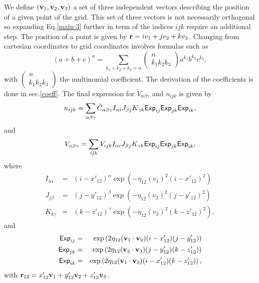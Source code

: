 \documentclass[prb]{revtex4}
\begin{document}
We define $({\bf v}_1, {\bf v}_2, {\bf v}_3)$ a set of three independent vectors
describing the position of a given point of the grid. This set of three vectors
is not necessarily orthogonal so expanding Eq.\ref{main:3} further in term of
the indices $ijk$ require an additional step. The position of a point is given
by ${\bf r} = i v_1 + j v_2 + k v_3$. Changing from cartesian coordinates to
grid coordinates involves formulas such as
\begin{equation}
  (a + b + c) ^ n = \sum_{k_1+k_2+k_3 = n} \left(\begin{array}{c} n\\k_1 k_2 k_3\end{array}\right) a^{k_1} b^{k_2} c^{k_3},
\end{equation}
with $\left(\begin{array}{c} n\\k_1 k_2 k_3\end{array}\right)$ the multinomial coefficient.
The derivation of the coefficients is done in sec.\ref{coeff}. The final expression for ${\tilde V}_{\alpha\beta\gamma}$ and $n_{ijk}$ is given by
\begin{equation}
  \label{main:8}
  n_{ijk} = \sum_{\alpha\beta\gamma}  {\tilde C}_{\alpha\beta\gamma} I_{\alpha i} J_{\beta j} K_{\gamma k} {\sf Exp}_{ij} {\sf Exp}_{jk} {\sf Exp}_{ik},
\end{equation}
and
\begin{eqnarray}
  \label{main:9}
  V_{\alpha\beta\gamma} = \sum_{ijk} {V}_{ijk} I_{\alpha i} J_{\beta j} K_{\gamma k} {\sf Exp}_{ij} {\sf Exp}_{jk} {\sf Exp}_{ik},
\end{eqnarray}
where
\begin{eqnarray}
  \label{main:10}
  I_{i\alpha} &=& (i - x'_{12})^\alpha \exp(-\eta_{12} (v_1)^2(i - x'_{12})^2)\\
  J_{j\beta} &=& (j - y'_{12})^\beta \exp(-\eta_{12} (v_2)^2(j  - y'_{12})^2)  \label{main:10b}
  \\
  K_{k\gamma} &=& (k - z'_{12})^\gamma \exp(-\eta_{12} (v_3)^2 (k - z'_{12})^2)  \label{main:10c},
\end{eqnarray}
and
\begin{eqnarray}
  \label{main:11}
        {\sf Exp}_{ij} &=& \exp\left(2 \eta_{12} ({\bf v}_1 \cdot {\bf v}_2) (i-x'_{12})(j-y'_{12}) \right)\\
        {\sf Exp}_{jk} &=& \exp\left(2 \eta_{12} ({\bf v}_2 \cdot {\bf v}_3) (j-y'_{12})(k-z'_{12}) \right)  \label{main:11b}\\
        {\sf Exp}_{ik} &=& \exp\left(2 \eta_{12} ({\bf v}_1 \cdot {\bf v}_3) (i-x'_{12})(k-z'_{12}) \right),  \label{main:11c}
\end{eqnarray}
with ${\bf r}_{12} = x'_{12} {\bf v}_1 + y'_{12} {\bf v}_2 + z'_{12} {\bf v}_3$.
\end{document}
